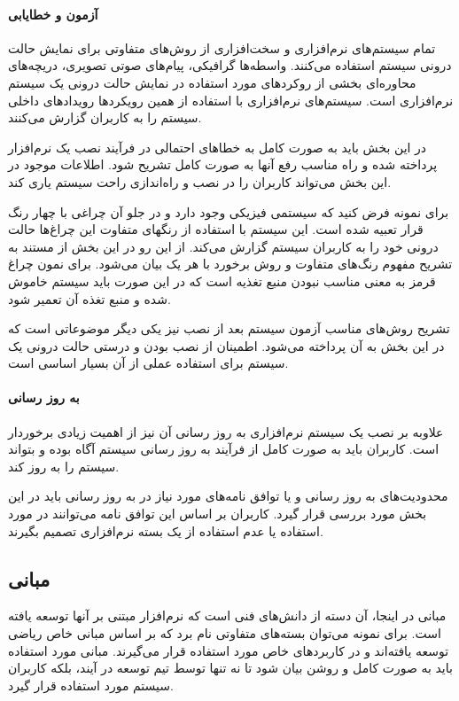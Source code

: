 \paragraph{آزمون و خطایابی}
    تمام سیستم‌های نرم‌افزاری و سخت‌افزاری از روش‌های متفاوتی برای نمایش حالت
    درونی سیستم استفاده می‌کنند.
    واسطه‌ها گرافیکی، پیام‌های صوتی تصویری، دریچه‌های محاوره‌ای بخشی از روکردهای
    مورد استفاده در نمایش حالت درونی یک سیستم نرم‌افزاری است. سیستم‌های
    نرم‌افزاری با استفاده از همین رویکردها رویدادهای داخلی سیستم را به
    کاربران گزارش می‌کنند.

    در این بخش باید به صورت کامل به خطاهای احتمالی در فرآیند نصب یک نرم‌افزار
    پرداخته شده و راه مناسب رفع آنها به صورت کامل تشریح شود. اطلاعات موجود در
    این بخش می‌تواند کاربران را در نصب و راه‌اندازی راحت سیستم یاری کند.

    برای نمونه فرض کنید که سیستمی فیزیکی وجود دارد و در جلو آن چراغی با چهار
    رنگ قرار تعبیه شده است.
    این سیستم با استفاده از رنگهای متفاوت این چراغ‌ها حالت درونی خود را به کاربران
    سیستم گزارش می‌کند.
    از این رو در این بخش از مستند به تشریح مفهوم رنگ‌های متفاوت و روش برخورد با هر 
یک بیان می‌شود. برای نمون چراغ قرمز به معنی مناسب نبودن
    منبع تغذیه است که در این صورت باید سیستم خاموش شده و منبع تغذه آن تعمیر شود.

    تشریح روش‌های مناسب آزمون سیستم بعد از نصب نیز یکی دیگر موضوعاتی است که در
    این بخش به آن پرداخته می‌شود. اطمینان از نصب بودن و درستی حالت درونی یک
    سیستم برای استفاده عملی از آن بسیار اساسی است.

\paragraph{به روز رسانی}
    علاوبه بر نصب یک سیستم نرم‌افزاری به روز رسانی آن نیز از اهمیت زیادی
    برخوردار است. کاربران باید به صورت کامل از فرآیند به روز رسانی سیستم آگاه
    بوده و بتواند سیستم را به روز کند.

    محدودیت‌های به روز رسانی و یا توافق نامه‌های مورد نیاز در به روز رسانی
    باید در این بخش مورد بررسی قرار گیرد. کاربران بر اساس این توافق نامه
    می‌توانند در مورد استفاده یا عدم استفاده از یک بسته نرم‌افزاری تصمیم بگیرند.
    
\subsection{مبانی}

مبانی در اینجا، آن دسته از دانش‌های فنی است که نرم‌افزار مبتنی بر آنها توسعه یافته است.
برای نمونه می‌توان بسته‌های متفاوتی نام برد که بر اساس مبانی خاص ریاضی توسعه یافته‌اند
و در کاربردهای خاص مورد استفاده قرار می‌گیرند. مبانی مورد استفاده باید به صورت کامل و روشن
بیان شود تا نه تنها توسط تیم توسعه در آیند، بلکه کاربران سیستم مورد استفاده قرار گیرد.

